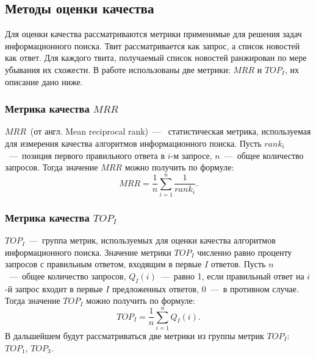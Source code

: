 \subsection{Методы оценки качества}
    Для оценки качества рассматриваются метрики применимые для решения задач информационного поиска.
    Твит рассматривается как запрос, а список новостей как ответ. 
    Для каждого твита, получаемый список новостей ранжирован по мере убывания их схожести.
    В работе использованы две метрики: $MRR$ и $TOP_I$, их описание дано ниже.

    \subsubsection{Метрика качества $MRR$}
    \label{subsubsec:MRR}
        $MRR$~(от англ. Mean reciprocal rank)~---~ статистическая метрика, используемая для измерения качества алгоритмов информационного поиска.
        Пусть $rank_i$~---~позиция первого правильного ответа в $i$-м запросе, $n$~---~общее количество запросов.
        Тогда значение $MRR$ можно получить по формуле:
        \begin{equation}
            MRR = \dfrac{1}{n} \sum_{i=1}^n \dfrac{1}{rank_i}.
        \end{equation}

    \subsubsection{Метрика качества $TOP_I$}
        $TOP_I$~---~группа метрик, используемых для оценки качества алгоритмов информационного поиска. Значение метрики $TOP_I$
        численно равно проценту запросов с правильным ответом, входящим в первые $I$ ответов.
        Пусть $n$~---~общее количество запросов, $Q_I(i)$~---~равно 1, если правильный ответ на $i$-й запрос входит в первые $I$ предложенных ответов, 0~---~в противном случае.
        Тогда значение $TOP_I$ можно получить по формуле:
        \begin{equation}
            TOP_I=\dfrac{1} {n} \sum_{i=1}^n Q_I(i).
        \end{equation}
        В дальшейшем будут рассматриваться две метрики из группы метрик $TOP_I$: $TOP_1$, $TOP_3$.


